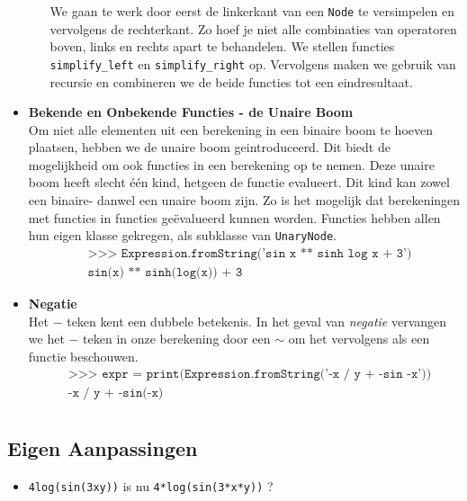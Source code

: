 \documentclass[12pt]{article}
\begin{document}
\begin{itemize}
\begin{itemize}
We gaan te werk door eerst de linkerkant van een \texttt{Node} te versimpelen en vervolgens de rechterkant. Zo hoef je niet alle combinaties van operatoren boven, links en rechts apart te behandelen. We stellen functies \texttt{simplify\_left} en \texttt{simplify\_right} op. Vervolgens maken we gebruik van recursie en combineren we de beide functies tot een eindresultaat. 
\end{itemize}
\vspace{1pc}
\item \textbf{Bekende en Onbekende Functies - de Unaire Boom} \\
Om niet alle elementen uit een berekening in een binaire boom te hoeven plaatsen, hebben we de unaire boom geintroduceerd. Dit biedt de mogelijkheid om ook functies in een berekening op te nemen. Deze unaire boom heeft slecht \'e\'en kind, hetgeen de functie evalueert. Dit kind kan zowel een binaire- danwel een unaire boom zijn. Zo is het mogelijk dat berekeningen met functies in functies ge\"evalueerd kunnen worden. Functies hebben allen hun eigen klasse gekregen, als subklasse van \texttt{UnaryNode}. 
\begin{align*}
&\texttt{>>> Expression.fromString('sin x ** sinh log x + 3')}\\
&\texttt{sin(x) ** sinh(log(x)) + 3}
\end{align*}

\item \textbf{Negatie} \\
Het $-$ teken kent een dubbele betekenis. In het geval van \textit{negatie} vervangen we het $-$ teken in onze berekening door een $\sim$ om het vervolgens als een functie beschouwen. 
\begin{align*}
&\texttt{>>> expr =  print(Expression.fromString('-x / y + -sin -x'))}\\
&\texttt{-x / y + -sin(-x)}\\
\end{align*}
\end{itemize}

\subsection*{Eigen Aanpassingen}
\begin{itemize}
\item \texttt{4log(sin(3xy))} is nu \texttt{4*log(sin(3*x*y))} ?
\end{itemize}
\end{document}
